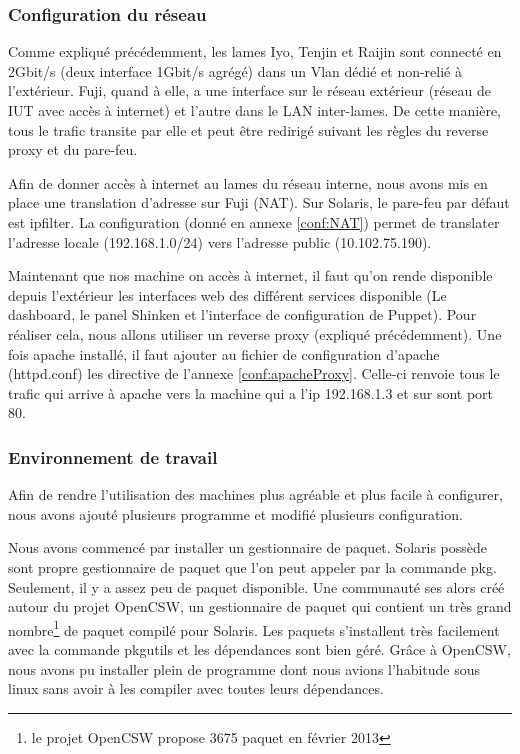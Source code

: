 \documentclass[a4paper,oneside]{report}
\begin{document}
\subsubsection{Configuration du réseau}
Comme expliqué précédemment, les lames Iyo, Tenjin et Raijin sont connecté en 2Gbit/s (deux interface 1Gbit/s agrégé) dans un Vlan dédié et non-relié à l'extérieur.
Fuji, quand à elle, a une interface sur le réseau extérieur (réseau de IUT avec accès à internet) et l'autre dans le LAN inter-lames.
De cette manière, tous le trafic transite par elle et peut être redirigé suivant les règles du reverse proxy et du pare-feu. 

Afin de donner accès à internet au lames du réseau interne, nous avons mis en place une translation d'adresse sur Fuji (NAT).
Sur Solaris, le pare-feu par défaut est ipfilter. La configuration (donné en annexe \ref{conf:NAT}) permet de translater l'adresse locale (192.168.1.0/24) vers l'adresse public (10.102.75.190).

Maintenant que nos machine on accès à internet, il faut qu'on rende disponible depuis l'extérieur les interfaces web des différent services disponible (Le dashboard, le panel Shinken et l'interface de configuration de Puppet).
Pour réaliser cela, nous allons utiliser un reverse proxy (expliqué précédemment). Une fois apache installé, il faut ajouter au fichier de configuration d'apache (httpd.conf) les directive de l'annexe \ref{conf:apacheProxy}.
Celle-ci renvoie tous le trafic qui arrive à apache vers la machine qui a l'ip 192.168.1.3 et sur sont port 80.

\subsubsection{Environnement de travail}
Afin de rendre l'utilisation des machines plus agréable et plus facile à configurer, nous avons ajouté plusieurs programme et modifié plusieurs configuration.

Nous avons commencé par installer un gestionnaire de paquet.
Solaris possède sont propre gestionnaire de paquet que l'on peut appeler par la commande pkg. Seulement, il y a assez peu de paquet disponible.
Une communauté ses alors créé autour du projet OpenCSW, un gestionnaire de paquet qui contient un très grand nombre\footnote{le projet OpenCSW propose 3675 paquet en février 2013} de paquet compilé pour Solaris.
Les paquets s'installent très facilement avec la commande pkgutils et les dépendances sont bien géré. Grâce à OpenCSW, nous avons pu installer plein de programme dont nous avions l'habitude sous linux sans avoir à les compiler avec toutes leurs dépendances. 
\end{document}
